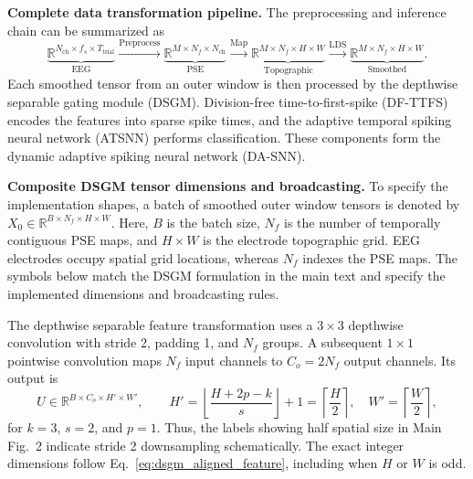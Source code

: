 \documentclass[12pt]{article}
\begin{document}
\textbf{Complete data transformation pipeline.}
The preprocessing and inference chain can be summarized as
\begin{equation}
\underbrace{\mathbb{R}^{N_{\mathrm{ch}} \times f_s \times T_{\mathrm{trial}}}}_{\text{EEG}}
\!\xrightarrow{\text{Preprocess}}\!
\underbrace{\mathbb{R}^{M \times N_f \times N_{\mathrm{ch}}}}_{\text{PSE}}
\!\xrightarrow{\text{Map}}\!
\underbrace{\mathbb{R}^{M \times N_f \times H \times W}}_{\text{Topographic}}
\!\xrightarrow{\text{LDS}}\!
\underbrace{\mathbb{R}^{M \times N_f \times H \times W}}_{\text{Smoothed}}.
\label{eq:preprocessing_pipeline}
\end{equation}
Each smoothed tensor from an outer window is then processed by the depthwise separable gating module (DSGM). Division-free time-to-first-spike (DF-TTFS) encodes the features into sparse spike times, and the adaptive temporal spiking neural network (ATSNN) performs classification. These components form the dynamic adaptive spiking neural network (DA-SNN).

\textbf{Composite DSGM tensor dimensions and broadcasting.}
To specify the implementation shapes, a batch of smoothed outer window tensors is denoted by $X_0\in\mathbb{R}^{B\times N_f\times H\times W}$. Here, $B$ is the batch size, $N_f$ is the number of temporally contiguous PSE maps, and $H\times W$ is the electrode topographic grid. EEG electrodes occupy spatial grid locations, whereas $N_f$ indexes the PSE maps. The symbols below match the DSGM formulation in the main text and specify the implemented dimensions and broadcasting rules.

The depthwise separable feature transformation uses a $3\times3$ depthwise convolution with stride 2, padding 1, and $N_f$ groups. A subsequent $1\times1$ pointwise convolution maps $N_f$ input channels to $C_o=2N_f$ output channels. Its output is
\begin{equation}
U\in\mathbb{R}^{B\times C_o\times H'\times W'},\qquad
H'=\left\lfloor\frac{H+2p-k}{s}\right\rfloor+1=\left\lceil\frac{H}{2}\right\rceil,\quad
W'=\left\lceil\frac{W}{2}\right\rceil,
\label{eq:dsgm_aligned_feature}
\end{equation}
for $k=3$, $s=2$, and $p=1$. Thus, the labels showing half spatial size in Main Fig.~2 indicate stride 2 downsampling schematically. The exact integer dimensions follow Eq.~\ref{eq:dsgm_aligned_feature}, including when $H$ or $W$ is odd.
\end{document}
